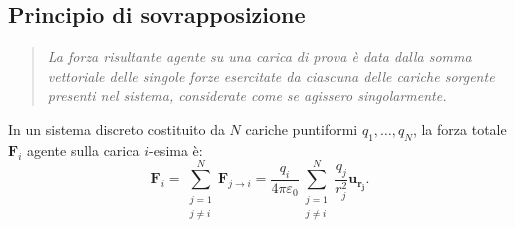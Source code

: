 \documentclass[a4paper,11pt]{report}
\begin{document}
\subsection{Principio di sovrapposizione}
\begin{quote}
    \textit{La forza risultante agente su una carica di prova è data dalla somma vettoriale delle singole forze esercitate da ciascuna delle cariche sorgente presenti nel sistema, considerate come se agissero singolarmente.}
\end{quote}
In un sistema discreto costituito da $N$ cariche puntiformi $q_1, \dots, q_N$, la forza totale $\bm{F}_i$ agente sulla carica $i$-esima è:
\begin{equation}
    \bm{F}_i = \sum_{\substack{j=1 \\ j \neq i}}^{N} \bm{F}_{j \to i} = \frac{q_i}{4\pi\varepsilon_0} \sum_{\substack{j=1 \\ j \neq i}}^{N} \frac{q_j}{r_j^2} \bm{u_{r_j}}.
    \label{eq:sovrapposizione_discreta}
\end{equation}
\end{document}
